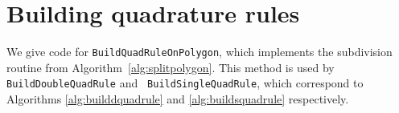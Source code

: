 

%

\section{Building quadrature rules}

We give code for {\tt BuildQuadRuleOnPolygon}, which implements the subdivision routine from
Algorithm~\ref{alg:splitpolygon}. This method is used by {\tt BuildDoubleQuadRule} and {\tt
BuildSingleQuadRule}, which correspond to Algorithms \ref{alg:builddquadrule} and \ref{alg:buildsquadrule}
respectively.

%






%
%
%
%



